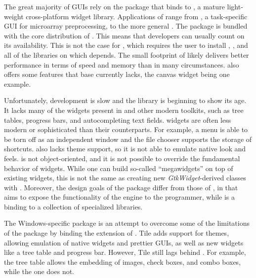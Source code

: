 \documentclass[article]{jss}
\begin{document}
The great majority of  GUIs rely on the 
package 
\citep{Rnews:Dalgaard:2001a, Rnews:Dalgaard:2002} that binds 
 to  \citep{ousterhout,welch}, a mature
light-weight cross-platform
widget library. Applications of  range from  
\citep{limma}, a task-specific GUI for microarray preprocessing, to
the more 
general  \citep{rcmndr}. The  package 
is bundled with the core distribution of 
. This means that developers can usually count on its
availability.
This is not the case for , which requires the user
to install , , and all of the libraries on which
depends. The small footprint of  likely delivers better
performance in
terms of speed and memory than  in many circumstances.
also offers some features that base  currently lacks, the
canvas widget
being one example.

Unfortunately,  development is slow and the library is
beginning to show its age. It lacks many of the widgets present in
 and other modern toolkits, such as tree tables, progress
bars, and autocompleting text fields.  widgets are often
less modern or sophisticated than their  counterparts. For
example, a  menu is able to be torn off as an independent
window and the  file chooser supports the storage of
shortcuts.  also lacks theme support, so it is not able to
emulate native look and feels.   is
not object-oriented, and it is not possible to override the
fundamental behavior of widgets.  While one can build so-called
``megawidgets'' on top of existing  widgets, this is not the
same as creating new \emph{GtkWidget}-derived classes with
. Moreover, the design goals of the  package
differ from those of , in that  aims to expose
the functionality of the  engine to the 
programmer, while  is a binding to a collection of
specialized  libraries.


The Windows-specific  package \citep{tcltk2} is an attempt to overcome some
of the limitations of the  package by binding the
 extension
\citep{tcltk-tile} of . Tile adds support for themes,
allowing
emulation of native widgets and prettier GUIs, as well as new widgets
like a tree table and progress bar. However, Tile still lags behind
. For example, the  tree table allows the
embedding of images,
check boxes, and combo boxes, while the  one does not.
\end{document}
